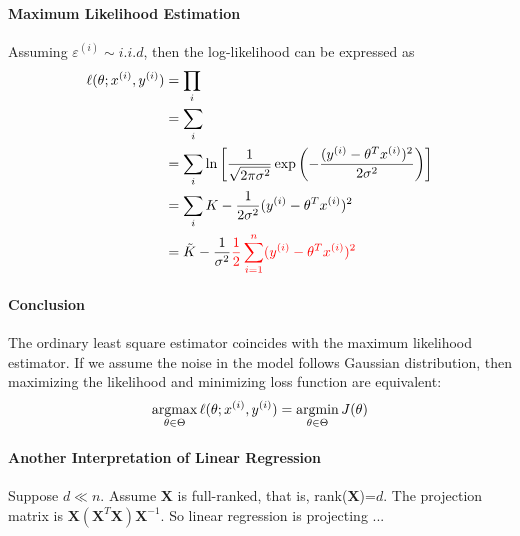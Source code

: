 \documentclass{report}
\newcommand{\upi}[0]{^{(i)}}
\newcommand{\bfX}[0]{\textbf{X}}
\begin{document}
        \paragraph{Maximum Likelihood Estimation} Assuming $\varepsilon\upi \sim i.i.d $, then the log-likelihood can be expressed as 
        \begin{align}
            \ell(\theta; x\upi, y\upi) &= \prod_i\\
            &= \sum_i \\
            &= \sum_i \ln \left[ \frac{1}{\sqrt{2\pi \sigma^2}} \exp\left(
                -\frac{(y^{(i)} - \theta^T x^{(i)})^2}{2 \sigma^2}
            \right) \right] \\
            &= \sum_i K - \frac{1}{2 \sigma^2}(y^{(i)} - \theta^T x^{(i)})^2 \\
            &= \tilde{K} - \frac{1}{\sigma^2} \red{
                \frac{1}{2} \sum_{i=1}^n (y^{(i)} - \theta^T x^{(i)})^2
            }
        \end{align}
        
        \paragraph{Conclusion} The ordinary least square estimator coincides with the maximum likelihood estimator. If we assume the noise in the model follows Gaussian distribution, then maximizing the likelihood and minimizing loss function are equivalent:
        \begin{align}
            \argmax_{\theta \in \Theta} \ell(\theta; x\upi, y\upi) = \argmin_{\theta \in \Theta} J(\theta)
        \end{align}
        
        \paragraph{Another Interpretation of Linear Regression} Suppose $d \ll n$. Assume $\textbf{X}$ is full-ranked, that is, rank(\textbf{X})=$d$. The projection matrix is $\bfX (\bfX^T \bfX)\bfX^{-1}$. So linear regression is projecting ...
\end{document}
